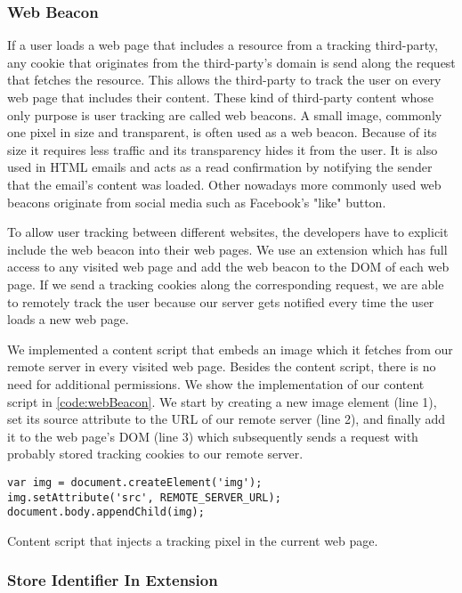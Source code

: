 \subsubsection{Web Beacon}
	
	If a user loads a web page that includes a resource from a tracking third-party, any cookie that originates from the third-party's domain is send along the request that fetches the resource. This allows the third-party to track the user on every web page that includes their content. These kind of third-party content whose only purpose is user tracking are called web beacons. A small image, commonly one pixel in size and transparent, is often used as a web beacon. Because of its size it requires less traffic and its transparency hides it from the user. It is also used in HTML emails and acts as a read confirmation by notifying the sender that the email's content was loaded. Other nowadays more commonly used web beacons originate from social media such as Facebook's "like" button. 
	
	To allow user tracking between different websites, the developers have to explicit include the web beacon into their web pages. We use an extension which has full access to any visited web page and add the web beacon to the DOM of each web page. If we send a tracking cookies along the corresponding request, we are able to remotely track the user because our server gets notified every time the user loads a new web page. 
	
	We implemented a content script that embeds an image which it fetches from our remote server in every visited web page. Besides the content script, there is no need for additional permissions. We show the implementation of our content script in \autoref{code:webBeacon}. We start by creating a new image element (line 1), set its source attribute to the URL of our remote server (line 2), and finally add it to the web page's DOM (line 3) which subsequently sends a request with probably stored tracking cookies to our remote server.
	
	\begin{code}
		\begin{lstlisting}
var img = document.createElement('img');
img.setAttribute('src', REMOTE_SERVER_URL);
document.body.appendChild(img);
\end{lstlisting}
		\caption{Content script that injects a tracking pixel in the current web page.}
		\label{code:webBeacon}
	\end{code}
	

\subsubsection{Store Identifier In Extension}

